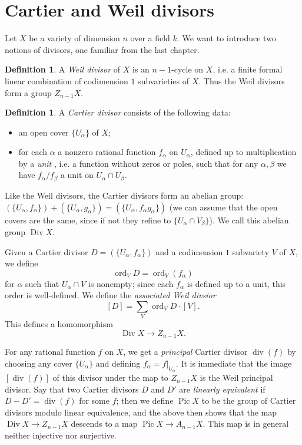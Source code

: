 \documentclass[leqno, openany]{memoir}
\theoremstyle{definition}
\newtheorem{defn}[thm]{Definition}
\theoremstyle{remark}
\theoremstyle{plain}
\theoremstyle{definition}
\theoremstyle{remark}
\renewcommand{\div}{\operatorname{div}}
\DeclareMathOperator{\Pic}{Pic}
\DeclareMathOperator{\ord}{ord}
\DeclareMathOperator{\Div}{Div}
\begin{document}
\section{Cartier and Weil divisors}
Let $X$ be a variety of dimension $n$ over a field $k$. We want to introduce two notions of divisors, one familiar from the last chapter.

\begin{defn}
A \textit{Weil divisor} of $X$ is an $n-1$-cycle on $X$, i.e. a finite formal linear combination of codimension $1$ subvarieties of $X$. Thus the Weil divisors form a group $Z_{n-1} X$.
\end{defn}

\begin{defn}
A \textit{Cartier divisor}  consists of the following data:
\begin{itemize}
\item an open cover $\{U_\alpha\}$ of $X$;
\item for each $\alpha$ a nonzero rational function $f_\alpha$ on $U_\alpha$, defined up to multiplication by a \textit{unit} , i.e. a function without zeros or poles, such that for any $\alpha, \beta$ we have $f_\alpha/f_\beta$ a unit on $U_\alpha \cap U_\beta$.
\end{itemize}
\end{defn}

Like the Weil divisors, the Cartier divisors form an abelian group: $(\{U_\alpha, f_\alpha\}) + (\{U_\alpha, g_\alpha\}) = (\{U_\alpha, f_\alpha g_\alpha\})$ (we can assume that the open covers are the same, since if not they refine to $\{U_\alpha \cap V_\beta\}$). We call this abelian group $\Div X$.

Given a Cartier divisor $D = (\{U_\alpha, f_\alpha\})$ and a codimension $1$ subvariety $V$ of $X$, we define \[ \ord_V D = \ord_V (f_\alpha) \] for $\alpha$ such that $U_\alpha \cap V$ is nonempty; since each $f_\alpha$ is defined up to a unit, this order is well-defined. We define the \textit{associated Weil divsior} \[ [D] = \sum_V \ord_V D \cdot [V]. \] This defines a homomorphism \[ \Div X \to Z_{n-1} X. \]

For any rational function $f$ on $X$, we get a \textit{principal} Cartier divisor $\div(f)$ by choosing any cover $\{U_\alpha\}$ and defining $f_\alpha = f|_{U_\alpha}$. It is immediate that the image $[\div(f)]$ of this divisor under the map to $Z_{n-1}X$ is the Weil principal divisor. Say that two Cartier divisors $D$ and $D'$ are \textit{linearly equivalent} if $D - D' = \div(f)$ for some $f$; then we define $\Pic X$ to be the group of Cartier divisors modulo linear equivalence, and the above then shows that the map $\Div X \to Z_{n-1} X$ descends to a map $\Pic X \to A_{n-1} X$. This map is in general neither injective nor surjective.
\end{document}
